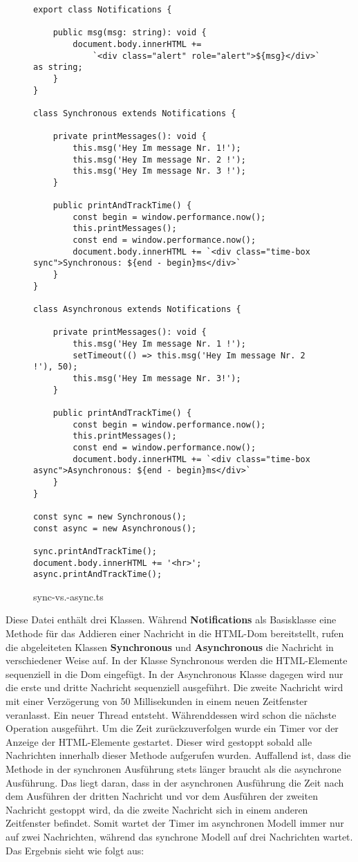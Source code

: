 \begin{figure}[H]
\begin{lstlisting}
export class Notifications {

    public msg(msg: string): void {
        document.body.innerHTML +=
            `<div class="alert" role="alert">${msg}</div>` as string;
    }
}

class Synchronous extends Notifications {

    private printMessages(): void {
        this.msg('Hey Im message Nr. 1!');
        this.msg('Hey Im message Nr. 2 !');
        this.msg('Hey Im message Nr. 3 !');
    }

    public printAndTrackTime() {
        const begin = window.performance.now();
        this.printMessages();
        const end = window.performance.now();
        document.body.innerHTML += `<div class="time-box sync">Synchronous: ${end - begin}ms</div>`
    }
}

class Asynchronous extends Notifications {

    private printMessages(): void {
        this.msg('Hey Im message Nr. 1 !');
        setTimeout(() => this.msg('Hey Im message Nr. 2 !'), 50);
        this.msg('Hey Im message Nr. 3!');
    }

    public printAndTrackTime() {
        const begin = window.performance.now();
        this.printMessages();
        const end = window.performance.now();
        document.body.innerHTML += `<div class="time-box async">Asynchronous: ${end - begin}ms</div>`
    }
}

const sync = new Synchronous();
const async = new Asynchronous();

sync.printAndTrackTime();
document.body.innerHTML += '<hr>';
async.printAndTrackTime();
\end{lstlisting}
\caption{sync-vs.-async.ts}
\end{figure}

\noindent
Diese Datei enthält drei Klassen. Während \textbf{Notifications} als Basisklasse eine Methode für das Addieren einer Nachricht in die HTML-Dom bereitstellt, rufen die abgeleiteten Klassen \textbf{Synchronous} und \textbf{Asynchronous} die Nachricht in verschiedener Weise auf. In der Klasse Synchronous werden die HTML-Elemente sequenziell in die Dom eingefügt. In der Asynchronous Klasse dagegen wird nur die erste und dritte Nachricht sequenziell ausgeführt. Die zweite Nachricht wird mit einer Verzögerung von 50 Millisekunden in einem neuen Zeitfenster veranlasst. Ein neuer Thread entsteht. Währenddessen wird schon die nächste Operation ausgeführt. Um die Zeit zurückzuverfolgen wurde ein Timer vor der Anzeige der HTML-Elemente gestartet. Dieser wird gestoppt sobald alle Nachrichten innerhalb dieser Methode aufgerufen wurden. Auffallend ist, dass die Methode in der synchronen Ausführung stets länger braucht als die asynchrone Ausführung. Das liegt daran, dass in der asynchronen Ausführung die Zeit nach dem Ausführen der dritten Nachricht und vor dem Ausführen der zweiten Nachricht gestoppt wird, da die zweite Nachricht sich in einem anderen Zeitfenster befindet. Somit wartet der Timer im asynchronen Modell immer nur auf zwei Nachrichten, während das synchrone Modell auf drei Nachrichten wartet.
Das Ergebnis sieht wie folgt aus:

